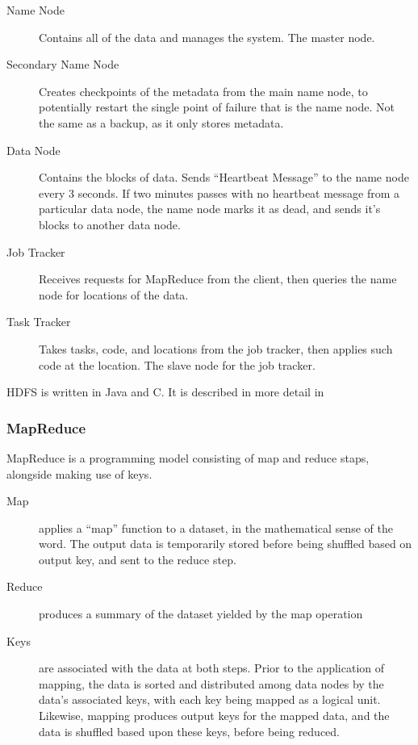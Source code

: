 \begin{description}

    \item[Name Node]
        Contains all of the data and manages the system. The master node.
    \item[Secondary Name Node]
        Creates checkpoints of the metadata from the main name node, to
        potentially restart the single point of failure that is the name node.
        Not the same as a backup, as it only stores metadata.
    \item[Data Node]
        Contains the blocks of data. Sends ``Heartbeat Message'' to the name
        node every 3 seconds. If two minutes passes with no heartbeat message
        from a particular data node, the name node marks it as dead, and sends
        it's blocks to another data node.
    \item[Job Tracker]
        Receives requests for MapReduce from the client, then queries the name
        node for locations of the data.
    \item[Task Tracker]
        Takes tasks, code, and locations from the job tracker, then applies such
        code at the location. The slave node for the job tracker.
\end{description}

HDFS is written in Java and C. It is described in more detail in
\cite{shvachko2010hadoop}

\hypertarget{sec:mapreduce}{%
    \subsubsection{MapReduce}\label{sec:mapreduce}}

MapReduce is a programming model consisting of map and reduce staps,
alongside making use of keys.

\begin{description}

    \item[Map]
        applies a ``map'' function to a dataset, in the mathematical sense of
        the word. The output data is temporarily stored before being shuffled
        based on output key, and sent to the reduce step.
    \item[Reduce]
        produces a summary of the dataset yielded by the map operation
    \item[Keys]
        are associated with the data at both steps. Prior to the application of
        mapping, the data is sorted and distributed among data nodes by the
        data's associated keys, with each key being mapped as a logical unit.
        Likewise, mapping produces output keys for the mapped data, and the data
        is shuffled based upon these keys, before being reduced.
\end{description}

